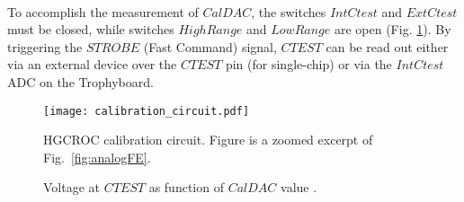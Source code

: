 \documentclass[../../main.tex]{subfiles}
\begin{document}
\\
To accomplish the measurement of $CalDAC$, the switches $IntCtest$ and $ExtCtest$ must be closed, while switches $HighRange$ and $LowRange$ are open (Fig. \ref{fig:calibCirc}). By triggering the $STROBE$ (Fast Command) signal, $CTEST$ can be read out either via an external device over the $CTEST$ pin (for single-chip) or via the $IntCtest$ ADC on the Trophyboard.
\begin{figure}[htp]
\begin{center}
	\texttt{[image: calibration\_circuit.pdf]}
	\caption{HGCROC calibration circuit. Figure is a zoomed excerpt of Fig.~\ref{fig:analogFE}.}
	\label{fig:calibCirc}
\end{center}
\end{figure}

\begin{figure}[htp]
	\caption{Voltage at $CTEST$ as function of $CalDAC$ value \cite{al}.}
	\label{fig:intCtest}
\end{figure}
\end{document}
